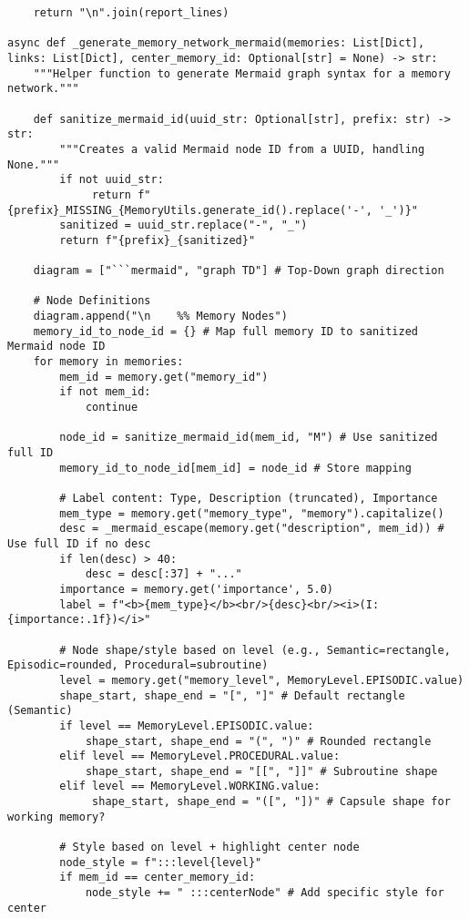 \documentclass[12pt,a4paper]{article}
\begin{document}
\begin{pageablecode}
\begin{verbatim}
    return "\n".join(report_lines)

async def _generate_memory_network_mermaid(memories: List[Dict], links: List[Dict], center_memory_id: Optional[str] = None) -> str:
    """Helper function to generate Mermaid graph syntax for a memory network."""

    def sanitize_mermaid_id(uuid_str: Optional[str], prefix: str) -> str:
        """Creates a valid Mermaid node ID from a UUID, handling None."""
        if not uuid_str:
             return f"{prefix}_MISSING_{MemoryUtils.generate_id().replace('-', '_')}"
        sanitized = uuid_str.replace("-", "_")
        return f"{prefix}_{sanitized}"

    diagram = ["```mermaid", "graph TD"] # Top-Down graph direction

    # Node Definitions
    diagram.append("\n    %% Memory Nodes")
    memory_id_to_node_id = {} # Map full memory ID to sanitized Mermaid node ID
    for memory in memories:
        mem_id = memory.get("memory_id")
        if not mem_id: 
            continue

        node_id = sanitize_mermaid_id(mem_id, "M") # Use sanitized full ID
        memory_id_to_node_id[mem_id] = node_id # Store mapping

        # Label content: Type, Description (truncated), Importance
        mem_type = memory.get("memory_type", "memory").capitalize()
        desc = _mermaid_escape(memory.get("description", mem_id)) # Use full ID if no desc
        if len(desc) > 40:
            desc = desc[:37] + "..."
        importance = memory.get('importance', 5.0)
        label = f"<b>{mem_type}</b><br/>{desc}<br/><i>(I: {importance:.1f})</i>"

        # Node shape/style based on level (e.g., Semantic=rectangle, Episodic=rounded, Procedural=subroutine)
        level = memory.get("memory_level", MemoryLevel.EPISODIC.value)
        shape_start, shape_end = "[", "]" # Default rectangle (Semantic)
        if level == MemoryLevel.EPISODIC.value:
            shape_start, shape_end = "(", ")" # Rounded rectangle
        elif level == MemoryLevel.PROCEDURAL.value:
            shape_start, shape_end = "[[", "]]" # Subroutine shape
        elif level == MemoryLevel.WORKING.value:
             shape_start, shape_end = "([", "])" # Capsule shape for working memory?

        # Style based on level + highlight center node
        node_style = f":::level{level}"
        if mem_id == center_memory_id:
            node_style += " :::centerNode" # Add specific style for center


\end{verbatim}
\end{pageablecode}
\end{document}
